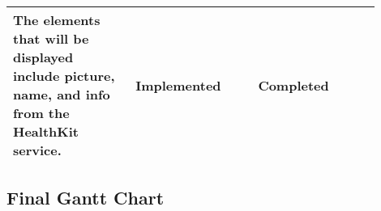 \begin{center}
\begin{tabular}{ |p{0.3\linewidth}|p{0.3\linewidth}|p{0.3\linewidth}| }
 \end{tabular}
\newpage

\begin{tabular}{ |p{0.3\linewidth}|p{0.3\linewidth}|p{0.3\linewidth}| } 
 \hline
 
 The elements that will be displayed include picture, name, and info from the HealthKit service. & Implemented & Completed \\ \hline
\end{tabular}
\end{center}

\subsection*{Final Gantt Chart}

\noindent{}
